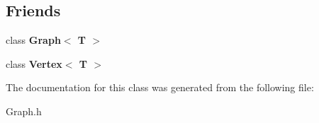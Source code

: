 \subsection*{Friends}
\begin{DoxyCompactItemize}
\item 
\hypertarget{classEdge_aefa9b76cd57411c5354e5620dc2d84dd}{class {\bfseries Graph$<$ T $>$}}\label{classEdge_aefa9b76cd57411c5354e5620dc2d84dd}

\item 
\hypertarget{classEdge_a2e120a12dec663fa334633b4f26cbed8}{class {\bfseries Vertex$<$ T $>$}}\label{classEdge_a2e120a12dec663fa334633b4f26cbed8}

\end{DoxyCompactItemize}


The documentation for this class was generated from the following file\-:\begin{DoxyCompactItemize}
\item 
Graph.\-h\end{DoxyCompactItemize}
